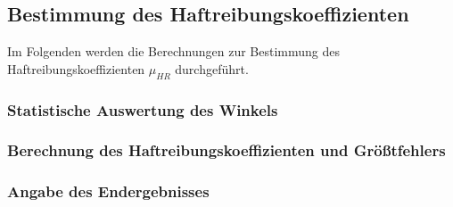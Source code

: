 \subsection{Bestimmung des Haftreibungskoeffizienten}

Im Folgenden werden die Berechnungen zur Bestimmung des Haftreibungskoeffizienten $\mu_{HR}$ durchgeführt.

\subsubsection{Statistische Auswertung des Winkels}


\subsubsection{Berechnung des Haftreibungskoeffizienten und Größtfehlers}

\subsubsection{Angabe des Endergebnisses}